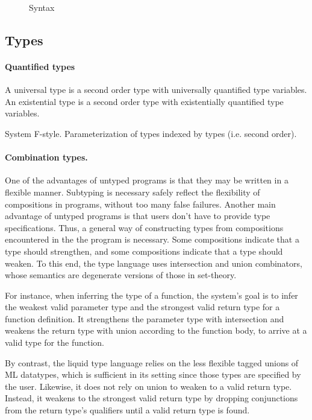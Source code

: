 \documentclass[sigplan,screen,review]{acmart}
\begin{document}
\begin{figure*}[h]
\caption{Syntax}
\label{fig:syntax}
\end{figure*}



\subsection{Types}

\paragraph{Quantified types}
A universal type is a second order type with universally quantified type variables. 
An existential type is a second order type with existentially quantified type variables. 

System F-style. Parameterization of types indexed by types (i.e. second order).


\paragraph{Combination types.}
One of the advantages of untyped programs is that they may be written in a flexible manner.
Subtyping is necessary safely reflect the flexibility of compositions in programs, without too many false failures.
Another main advantage of untyped programs is that users don't have to provide type specifications.
Thus, a general way of constructing types from compositions encountered in the the program is necessary.
Some compositions indicate that a type should strengthen, and some compositions indicate that a type should weaken.
To this end, the type language uses intersection and union combinators, 
whose semantics are degenerate versions of those in set-theory.

For instance, when inferring the type of a function, 
the system's goal is to infer the weakest valid parameter type and the strongest valid return type for a function definition.
It strengthens the parameter type with intersection and weakens the return type with union according to the function body,
to arrive at a valid type for the function.  

By contrast, the liquid type language relies on the less flexible tagged unions of ML datatypes, 
which is sufficient in its setting since those types are specified by the user. 
Likewise, it does not rely on union to weaken to a valid return type. 
Instead, it weakens to the strongest valid return type by dropping conjunctions from 
the return type's qualifiers until a valid return type is found.
\end{document}
